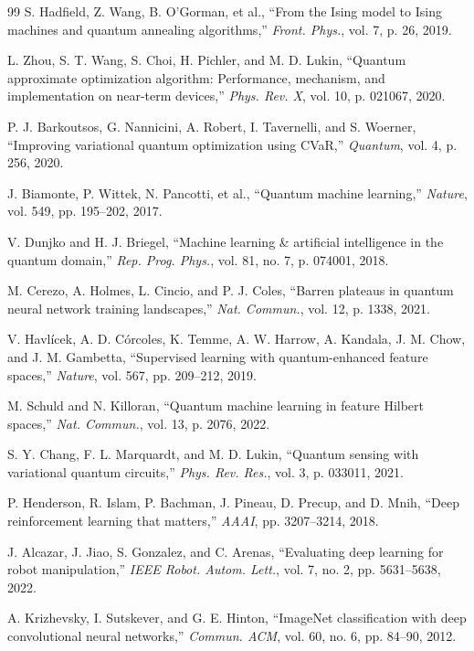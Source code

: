 \documentclass[journal]{IEEEtran}
\begin{document}
\begin{thebibliography}{99}
 S. Hadfield, Z. Wang, B. O'Gorman, et al., ``From the Ising model to Ising machines and quantum annealing algorithms,'' \textit{Front. Phys.}, vol. 7, p. 26, 2019.

 L. Zhou, S. T. Wang, S. Choi, H. Pichler, and M. D. Lukin, ``Quantum approximate optimization algorithm: Performance, mechanism, and implementation on near-term devices,'' \textit{Phys. Rev. X}, vol. 10, p. 021067, 2020.

 P. J. Barkoutsos, G. Nannicini, A. Robert, I. Tavernelli, and S. Woerner, ``Improving variational quantum optimization using CVaR,'' \textit{Quantum}, vol. 4, p. 256, 2020.

 J. Biamonte, P. Wittek, N. Pancotti, et al., ``Quantum machine learning,'' \textit{Nature}, vol. 549, pp. 195--202, 2017.

 V. Dunjko and H. J. Briegel, ``Machine learning \& artificial intelligence in the quantum domain,'' \textit{Rep. Prog. Phys.}, vol. 81, no. 7, p. 074001, 2018.

 M. Cerezo, A. Holmes, L. Cincio, and P. J. Coles, ``Barren plateaus in quantum neural network training landscapes,'' \textit{Nat. Commun.}, vol. 12, p. 1338, 2021.

 V. Havl\'icek, A. D. C\'orcoles, K. Temme, A. W. Harrow, A. Kandala, J. M. Chow, and J. M. Gambetta, ``Supervised learning with quantum-enhanced feature spaces,'' \textit{Nature}, vol. 567, pp. 209--212, 2019.

 M. Schuld and N. Killoran, ``Quantum machine learning in feature Hilbert spaces,'' \textit{Nat. Commun.}, vol. 13, p. 2076, 2022.

 S. Y. Chang, F. L. Marquardt, and M. D. Lukin, ``Quantum sensing with variational quantum circuits,'' \textit{Phys. Rev. Res.}, vol. 3, p. 033011, 2021.

 P. Henderson, R. Islam, P. Bachman, J. Pineau, D. Precup, and D. Mnih, ``Deep reinforcement learning that matters,'' \textit{AAAI}, pp. 3207--3214, 2018.

 J. Alcazar, J. Jiao, S. Gonzalez, and C. Arenas, ``Evaluating deep learning for robot manipulation,'' \textit{IEEE Robot. Autom. Lett.}, vol. 7, no. 2, pp. 5631--5638, 2022.

 A. Krizhevsky, I. Sutskever, and G. E. Hinton, ``ImageNet classification with deep convolutional neural networks,'' \textit{Commun. ACM}, vol. 60, no. 6, pp. 84--90, 2012.


\end{thebibliography}
\end{document}
